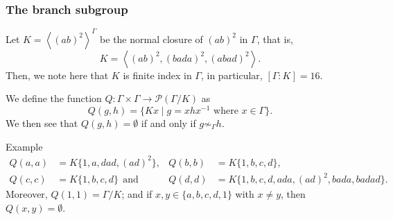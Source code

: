 \documentclass[aspectratio=169,10pt]{beamer}
\newcommand\question[1]{\begin{center}{\color{OwlBlue}#1}\end{center}}
\newcommand\PowerSet[1]{{\mathcal{P}(#1)}}
\newcommand\Grig{{\Gamma}}
\newcommand\SubK{{K}}
\begin{document}
\begin{frame}[t]
	\frametitle{The branch subgroup}

	Let $\SubK = \left\langle (ab)^2 \right\rangle^\Grig$ be the normal closure of $(ab)^2$ in $\Grig$, that is,
	\[
		\SubK
		=
		\left\langle
		(ab)^2,
		(bada)^2,
		(abad)^2
		\right\rangle.
	\]
	Then, we note here that $\SubK$ is finite index in $\Grig$, in particular, $[\Grig:\SubK]=16$.

	\begin{definition}
		We define the function $Q\colon \Grig\times\Grig\to \PowerSet{\Grig/\SubK}$ as
		\[
			Q(g,h)
			=
			\{
			\SubK x
			\mid
			g = xhx^{-1}
			\text{ where }
			x\in \Grig
			\}.
		\]
		We then see that $Q(g,h)=\emptyset$ if and only if $g\not\sim_\Grig h$.
	\end{definition}

	\begin{block}{Example}
		\begin{align*}
			Q(a,a) & = \SubK\{1,a,dad,(ad)^2\},                 &
			Q(b,b) & = \SubK\{1,b,c,d\},                          \\
			Q(c,c) & = \SubK\{1,b,c,d\}\ \ \text{and}           &
			Q(d,d) & = \SubK\{1,b,c,d,ada,(ad)^2,bada, badad\}.
		\end{align*}
		Moreover, $Q(1,1)=\Grig/\SubK$; and if $x,y\in \{a,b,c,d,1\}$ with $x\neq y$, then $Q(x,y)=\emptyset$.
	\end{block}

\end{frame}

\end{document}
